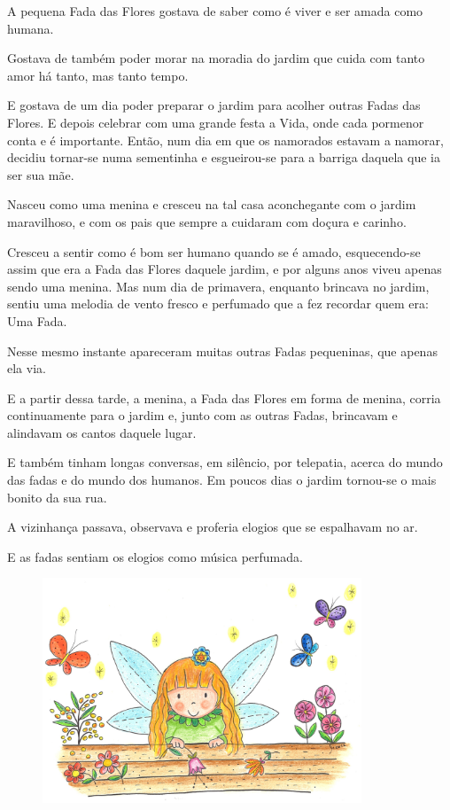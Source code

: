 \documentclass[12pt, a4paper, twoside]{memoir}
\begin{document}
A pequena Fada das Flores gostava de saber como é viver e ser amada como humana.

Gostava de também poder morar na moradia do jardim que cuida com tanto amor há tanto, mas tanto tempo.

E gostava de um dia poder preparar o jardim para acolher outras Fadas das Flores. E depois celebrar com uma grande festa a Vida, onde cada pormenor conta e é importante.
\bigbreak
Então, num dia em que os namorados estavam a namorar, decidiu tornar-se numa sementinha e esgueirou-se para a barriga daquela que ia ser sua mãe.

Nasceu como uma menina e cresceu na tal casa aconchegante com o jardim maravilhoso, e com os pais que sempre a cuidaram com doçura e carinho.


Cresceu a sentir como é bom ser humano quando se é amado, esquecendo-se assim que era a Fada das Flores daquele jardim, e por alguns anos viveu apenas sendo uma menina.
\bigbreak
Mas num dia de primavera, enquanto brincava no jardim, sentiu uma melodia de vento fresco e perfumado que a fez recordar quem era: Uma Fada.

Nesse mesmo instante apareceram muitas outras Fadas pequeninas, que apenas ela via.

E a partir dessa tarde, a menina, a Fada das Flores em forma de menina, corria continuamente para o jardim e, junto com as outras Fadas, brincavam e alindavam os cantos daquele lugar.

E também tinham longas conversas, em silêncio, por telepatia, acerca do mundo das fadas e do mundo dos humanos.
\bigbreak
Em poucos dias o jardim tornou-se o mais bonito da sua rua.

A vizinhança passava, observava e proferia elogios que se espalhavam no ar.

E as fadas sentiam os elogios como música perfumada.
\bigbreak

\begin{figure}[h]
    \centering
    \includegraphics[width=0.85\textwidth]{no_deque}
\end{figure}
\end{document}
